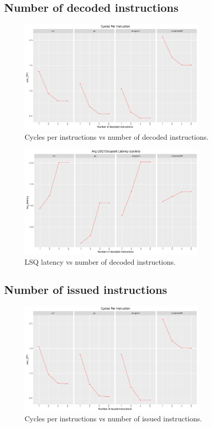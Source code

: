 \documentclass[10pt]{scrartcl}
\begin{document}
\subsection{Number of decoded instructions}

\begin{figure}[h]
  \centering
  \includegraphics[width=0.8\textwidth]{Plots/plot_D_sim_CPI}
  \caption{Cycles per instructions vs number of decoded instructions.}\label{fig:d_sim_cpi}
\end{figure}

\begin{figure}[h]
  \centering
  \includegraphics[width=0.8\textwidth]{Plots/plot_D_lsq_latency}
  \caption{LSQ latency vs number of decoded instructions.}\label{fig:d_lsq_latency}
\end{figure}

\FloatBarrier

\subsection{Number of issued instructions}

\begin{figure}[h]
  \centering
  \includegraphics[width=0.8\textwidth]{Plots/plot_I_sim_CPI}
  \caption{Cycles per instructions vs number of issued instructions.}\label{fig:i_sim_cpi}
\end{figure}
\end{document}
